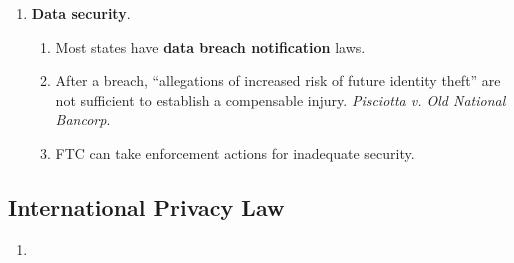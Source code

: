 \begin{enumerate}
\begin{enumerate}
\begin{enumerate}
            COPPA---even if the site doesn't know the identity of the child.
        \end{enumerate}
        \item \textbf{Defining PII}.
        \begin{enumerate}
            \item We lack a uniform definition.
            \item Three approaches:\footnote{Casebook p. 873.}
            \begin{enumerate}
                \item Tautological: PII identifies people.
                \item Non-public: any non-public information is personally 
                identifying.
                \item Specific types: list data fields that count as PII.
            \end{enumerate}
            \item Paul Ohm: abandon PII.\footnote{Casebook p. 877.}
            \item Solove and Schwartz: identifiability (and risk) is a 
            continuum. More identifiability means more risk.
            \item FTC staff report: when is information not ``reasonably 
            linkable'' to a person?---When companies do not re-identify it.
            \item Takeaway: lots of legal uncertainty about the definition of 
            PII, here and abroad. EU may have broader definitions.
            \item \textbf{Zip codes} can be PII. \emph{Pineda v. 
            Williams-Sonoma}.
        \end{enumerate}
    \end{enumerate}
    \item \textbf{Data security}.
    \begin{enumerate}
        \item Most states have \textbf{data breach notification} laws.
        \item After a breach, ``allegations of increased risk of future 
        identity theft'' are not sufficient to establish a compensable injury. 
        \emph{Pisciotta v. Old National Bancorp}.
        \item FTC can take enforcement actions for inadequate security.
    \end{enumerate}
\end{enumerate}

\newpage

\subsection{International Privacy Law}

\begin{enumerate}
    \item %
\end{enumerate}
